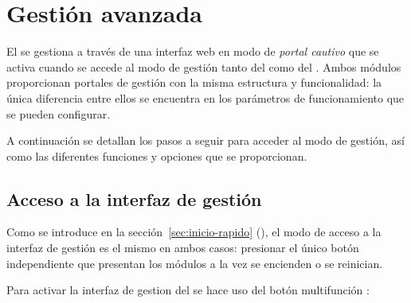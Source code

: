 \section{Gestión avanzada}
\label{sec:gestion-avanzada}

El \CMS se gestiona a través de una interfaz web en modo de \emph{portal cautivo} que se activa cuando se accede al modo de gestión tanto del \MI como del \ME.
Ambos módulos proporcionan portales de gestión con la misma estructura y funcionalidad: la única diferencia entre ellos se encuentra en los parámetros de funcionamiento que se pueden configurar.

A continuación se detallan los pasos a seguir para acceder al modo de gestión, así como las diferentes funciones y opciones que se proporcionan.

\subsection{Acceso a la interfaz de gestión}
\label{sec:acceso-gestion}

Como se introduce en la sección~\ref{sec:inicio-rapido} (\textit{}), el modo de acceso a la interfaz de gestión es el mismo en ambos casos: presionar el único botón independiente que presentan los módulos a la vez se encienden o se reinician.

Para activar la interfaz de gestion del \MIE se hace uso del botón multifunción :

